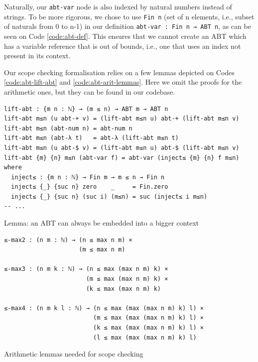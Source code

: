Naturally, our \verb$abt-var$ node is also indexed by natural numbers instead of strings. To be more rigorous, we chose to use \verb$Fin n$ (set of n elements, i.e., subset of naturals from 0 to n-1) in our definition \verb$abt-var : Fin n → ABT n$, as can be seen on Code \ref{code:abt-def}. This ensures that we cannot create an ABT which has a variable reference that is out of bounds, i.e., one that uses an index not present in its context.

Our scope checking formalisation relies on a few lemmas depicted on Codes \ref{code:abt-lift-abt} and \ref{code:abt-arit-lemmas}. Here we omit the proofs for the arithmetic ones, but they can be found in our codebase.

\begin{listing}[H]
\begin{verbatim}
lift-abt : {m n : ℕ} → (m ≤ n) → ABT m → ABT n
lift-abt m≤n (u abt-+ v) = (lift-abt m≤n u) abt-+ (lift-abt m≤n v)
lift-abt m≤n (abt-num n) = abt-num n
lift-abt m≤n (abt-λ t)   = abt-λ (lift-abt m≤n t)
lift-abt m≤n (u abt-$ v) = (lift-abt m≤n u) abt-$ (lift-abt m≤n v)
lift-abt {m} {n} m≤n (abt-var f) = abt-var (inject≤ {m} {n} f m≤n) where
  inject≤ : {m n : ℕ} → Fin m → m ≤ n → Fin n
  inject≤ {_} {suc n} zero    _     = Fin.zero
  inject≤ {_} {suc n} (suc i) (m≤n) = suc (inject≤ i m≤n)
-- ...
\end{verbatim}
\caption{Lemma: an ABT can always be embedded into a bigger context}
\label{code:abt-lift-abt}
\end{listing}

\begin{listing}[H]
\begin{verbatim}
≤-max2 : (n m : ℕ) → (n ≤ max n m) ×
                     (m ≤ max n m)

≤-max3 : (n m k : ℕ) → (n ≤ max (max n m) k) ×
                       (m ≤ max (max n m) k) ×
                       (k ≤ max (max n m) k)

≤-max4 : (n m k l : ℕ) → (n ≤ max (max (max n m) k) l) ×
                         (m ≤ max (max (max n m) k) l) ×
                         (k ≤ max (max (max n m) k) l) ×
                         (l ≤ max (max (max n m) k) l)
\end{verbatim}
\caption{Arithmetic lemmas needed for scope checking}
\label{code:abt-arit-lemmas}
\end{listing}

